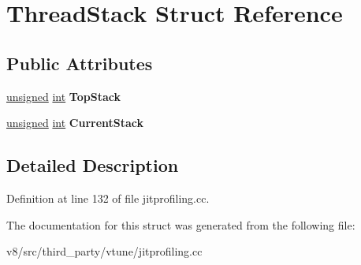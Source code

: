 \hypertarget{structThreadStack}{}\section{Thread\+Stack Struct Reference}
\label{structThreadStack}
\subsection*{Public Attributes}
\begin{DoxyCompactItemize}
\item 
\mbox{\label{structThreadStack_a04b1a308e0995dfb38ab967929a0fc5f}} 
\mbox{\hyperlink{classunsigned}{unsigned}} \mbox{\hyperlink{classint}{int}} {\bfseries Top\+Stack}
\item 
\mbox{\label{structThreadStack_af7885747136b2ac6f58da881307e72b4}} 
\mbox{\hyperlink{classunsigned}{unsigned}} \mbox{\hyperlink{classint}{int}} {\bfseries Current\+Stack}
\end{DoxyCompactItemize}


\subsection{Detailed Description}


Definition at line 132 of file jitprofiling.\+cc.



The documentation for this struct was generated from the following file\+:\begin{DoxyCompactItemize}
\item 
v8/src/third\+\_\+party/vtune/jitprofiling.\+cc\end{DoxyCompactItemize}
